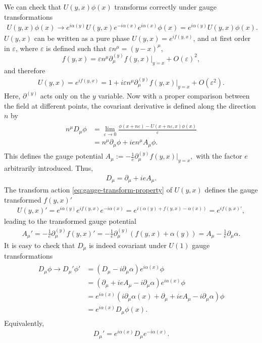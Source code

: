 We can check that $U(y, x) \phi(x)$ transforms correctly under gauge transformations 
\begin{align}
   U(y, x)\phi(x) \to e^{i\alpha(y)} U(y, x) e^{-i\alpha(x)} e^{i\alpha(x)} \phi(x) = e^{i\alpha(y)} U(y, x) \phi(x).
   \label{eq:gauge-transform-property}
\end{align}
$U(y, x)$ can be written as a pure phase $U(y, x) = e^{if(y, x)}$, and at first order in $\varepsilon$, where $\varepsilon$ is defined such that $\varepsilon n^\mu = (y-x)^\mu$, 
$$f(y, x) =  \varepsilon n^\mu \partial^{(y)}_\mu f(y, x)\lvert_{y=x} + O(\varepsilon)^2,$$
and therefore
\begin{align}
    U(y, x) = e^{if(y, x)} = 1 + i \varepsilon n^\mu \partial^{(y)}_\mu f(y, x)\lvert_{y=x} + O(\varepsilon^2).
\end{align}
Here, $\partial^{(y)}$ acts only on the $y$ variable.
Now with a proper comparison between the field at different points, the covariant derivative is defined along the direction $n$ by
\begin{align}
    \begin{split}
    n^\mu D_\mu \phi &= \lim_{\varepsilon \to 0} \frac{\phi(x+n\varepsilon) - U(x + n \varepsilon, x)\phi(x)}{\varepsilon} \\
    &= n^\mu\partial_\mu \phi + ie  n^\mu A_\mu \phi.
    \end{split}
\end{align}
This defines the gauge potential $A_\mu := - \frac{1}{e} \partial^{(y)}_\mu f(y, x)\lvert_{y=x},$ with the factor $e$ arbitrarily introduced.
Thus,
\begin{align}
    D_\mu = \partial_\mu + i e A_\mu.
\end{align}
The transform action \eqref{eq:gauge-transform-property} of $U(y, x)$  defines the gauge transformed $f(y, x)'$
\begin{align}
    U(y, x)'=e^{i\alpha(y)} e^{i f(y, x)} e^{-i\alpha(x)} =  e^{i( \alpha(y) + f(y, x) - \alpha(x))} = e^{if(y, x)'},
\end{align}
leading to the transformed gauge potential
\begin{align}
    A_\mu' = -\frac{1}{e}\partial_\mu^{(y)} f(y, x)' =- 
      \frac{1}{e}\partial_\mu^{(y)} (f(y, x) + \alpha(y))   = A_\mu - \frac{1}{e}\partial_\mu\alpha.
\end{align}
It is easy to check that $D_\mu$ is indeed covariant under $U(1)$ gauge transformations
\begin{align}
\begin{split}
    D_\mu \phi \to D_\mu'\phi' &= (D_\mu - i\partial_\mu \alpha) e^{i\alpha(x)}\phi \\
   &= (\partial_\mu + ie A_\mu - i\partial_\mu \alpha) e^{i\alpha(x)}\phi \\ 
   &= e^{i\alpha(x)}(i\partial_\mu\alpha(x) + \partial_\mu + ie A_\mu - i\partial_\mu \alpha) \phi \\ 
   &= e^{i\alpha(x)} D_\mu \phi(x).
\end{split}\end{align}
Equivalently, 
\begin{align}
    D_\mu' = e^{i\alpha(x)} D_\mu e^{-i\alpha(x)}.
    \label{eq:covariance}
\end{align}


